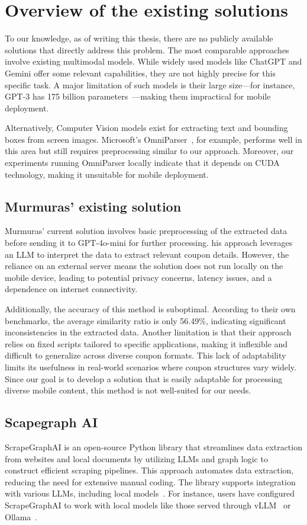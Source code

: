 \documentclass[licencjacka,en]{docs/pracamgr}
\begin{document}
\chapter{Overview of the existing solutions}
To our knowledge, as of writing this thesis, there are no publicly available solutions that directly address this problem. The most comparable approaches involve existing multimodal models. While widely used models like ChatGPT and Gemini offer some relevant capabilities, they are not highly precise for this specific task. A major limitation of such models is their large size—for instance, GPT-3 has 175 billion parameters~\cite{chatgpt_params}—making them impractical for mobile deployment.

Alternatively, Computer Vision models exist for extracting text and bounding boxes from screen images. Microsoft’s OmniParser~\cite{omniparser_intro}, for example, performs well in this area but still requires preprocessing similar to our approach. Moreover, our experiments running OmniParser locally indicate that it depends on CUDA technology, making it unsuitable for mobile deployment.



\section{Murmuras' existing solution} 
Murmuras’ current solution involves basic preprocessing of the extracted data before sending it to GPT-4o-mini for further processing. his approach leverages an LLM to interpret the data to extract relevant coupon details. However, the reliance on an external server means the solution does not run locally on the mobile device, leading to potential privacy concerns, latency issues, and a dependence on internet connectivity. 

Additionally, the accuracy of this method is suboptimal. According to their own benchmarks, the average similarity ratio is only 56.49\%, indicating significant inconsistencies in the extracted data. Another limitation is that their approach relies on fixed scripts tailored to specific applications, making it inflexible and difficult to generalize across diverse coupon formats. This lack of adaptability limits its usefulness in real-world scenarios where coupon structures vary widely. Since our goal is to develop a solution that is easily adaptable for processing diverse mobile content, this method is not well-suited for our needs.


\section{Scapegraph AI}
ScrapeGraphAI is an open-source Python library that streamlines data extraction from websites and local documents by utilizing LLMs and graph logic to construct efficient scraping pipelines. This approach automates data extraction, reducing the need for extensive manual coding. The library supports integration with various LLMs, including local models~\cite{scapegraph_intro}. For instance, users have configured ScrapeGraphAI to work with local models like those served through vLLM~\cite{gh_issue_810_scapegraph} or Ollama~\cite{gh_issue_752_scapegraph}.
\end{document}

